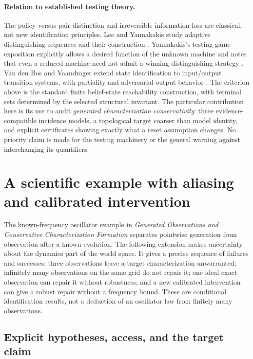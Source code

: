 \documentclass[11pt]{article}
\theoremstyle{definition}
\begin{document}
\paragraph{Relation to established testing theory.}
The policy-versus-pair distinction and irreversible information loss are
classical, not new identification principles. Lee and Yannakakis study
adaptive distinguishing sequences and their construction
\cite{seqLY1994,seqLY1996}. Yannakakis's testing-game exposition explicitly
allows a desired function of the unknown machine and notes that even a
reduced machine need not admit a winning distinguishing strategy
\cite{seqYannakakis2006}. Van den Bos and Vaandrager extend state
identification to input/output transition systems, with partiality and
adversarial output behavior \cite{seqBosVaandrager2021}. The criterion
above is the standard finite belief-state reachability construction,
with terminal sets determined by the selected structural invariant.
The particular contribution here is its use to audit \emph{generated
characterization conservativity}: three evidence-compatible incidence
models, a topological target coarser than model identity, and explicit
certificates showing exactly what a reset assumption changes. No priority
claim is made for the testing machinery or the general warning against
interchanging its quantifiers.


\section{A scientific example with aliasing and calibrated intervention}
\label{sec:sci-evidence-example}

The known-frequency oscillator example in
\emph{Generated Observations and Conservative Characterization Formation}
separates pointwise generation from observation after a known evolution.
The following extension makes uncertainty about the dynamics part of the
world space. It gives a precise sequence of failures and successes:
three observations leave a target characterization unwarranted; infinitely
many observations on the same grid do not repair it; one ideal exact
observation can repair it without robustness; and a new calibrated
intervention can give a robust repair without a frequency bound. These are
conditional identification results, not a deduction of an oscillator
law from finitely many observations.

\subsection{Explicit hypotheses, access, and the target claim}
\end{document}
